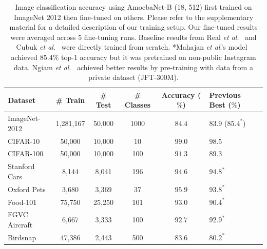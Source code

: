 \documentclass{article}
\def\onedot{.}
\def\etal{\emph{et al}\onedot}
\begin{document}
\begin{table}[t]
\begin{small}
\begin{center}
\caption{Image classification accuracy using AmoebaNet-B (18, 512) first trained on ImageNet 2012 then fine-tuned on others. Please refer to the supplementary material for a detailed description of our training setup.  Our fine-tuned results were averaged across 5 fine-tuning runs.  Baseline results from  Real \etal~\cite{real2018regularized} and Cubuk \etal~\cite{cubuk2018autoaugment} were directly trained from scratch.  *Mahajan \etal's model~\cite{mahajan2018exploring} achieved $85.4\%$ top-1 accuracy but it was pretrained on non-public Instagram data. Ngiam \etal~\cite{ngiam2018domain} achieved better results by pre-training with data from a private dataset (JFT-300M).}
\label{table:cv_results}
\begin{tabular}{lccccl}
\toprule
Dataset & \# Train & \# Test & \# Classes & Accuracy ($\%$) & Previous Best ($\%$)  \\ 
\midrule
 ImageNet-2012 & 1,281,167 & 50,000 & 1000 & $\mathbf{84.4}$ & $83.9$ \cite{real2018regularized} ($85.4^*$\cite{mahajan2018exploring}) \\
 CIFAR-10  & 50,000 & 10,000 & 10  & $\mathbf{99.0}$ & $98.5$ \cite{cubuk2018autoaugment}  \\ 
 CIFAR-100 &  50,000 & 10,000 & 100       & $\mathbf{91.3}$ & $89.3$ \cite{cubuk2018autoaugment}  \\ 
 Stanford Cars   & 8,144 & 8,041 & 196   & $94.6$ & $\mathbf{94.8^*}$ \cite{cubuk2018autoaugment}  \\
 Oxford Pets &3,680 & 3,369 & 37  & $\mathbf{95.9}$ & $93.8^*$ \cite{peng2018object}  \\ 
 Food-101    & 75,750 & 25,250 & 101      & $\mathbf{93.0}$ & $90.4^*$ \cite{Cui2018}  \\
 FGVC Aircraft  & 6,667 &3,333 & 100   & $92.7$ & $\mathbf{92.9^*}$ \cite{Yu18}  \\
 Birdsnap & 47,386 & 2,443  & 500     & $\mathbf{83.6}$ & $80.2^*$ \cite{wei2018mask}  \\
\bottomrule
\end{tabular}
\end{center}
\end{small}
\end{table}
\end{document}
